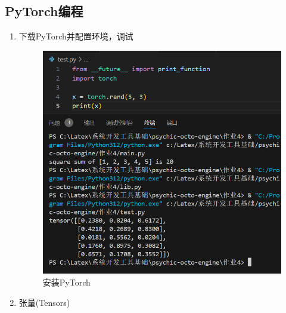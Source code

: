 \documentclass{ctexart}
\begin{document}
\subsection{PyTorch编程}
\begin{enumerate}
\item 下载PyTorch并配置环境，调试
\begin{figure}[H]
    \centering
    \includegraphics[width=14cm]{04b85f81e2ad45d4282cce5fbfb0b2cf.png}
    \caption{安装PyTorch}
    \label{fig:20}
    \end{figure}
    \item 张量(Tensors)
    \begin{figure}[H]
    \centering

\end{figure}
\end{enumerate}
\end{document}
